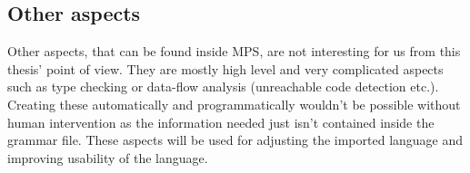 \subsection{Other aspects}
Other aspects, that can be found inside MPS, are not interesting for us from this thesis' point of view.
They are mostly high level and very complicated aspects such as type checking or data-flow analysis (unreachable code detection etc.).
Creating these automatically and programmatically wouldn't be possible without human intervention as the information needed just isn't contained inside the grammar file.
These aspects will be used for adjusting the imported language and improving usability of the language.